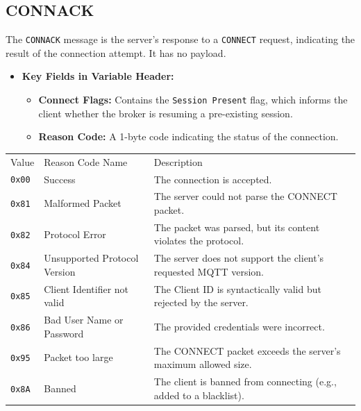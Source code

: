 \documentclass[a4paper, 12pt]{book} %
\begin{document}
\subsection{CONNACK}\label{connack}

The \texttt{CONNACK} message is the server's response to a
\texttt{CONNECT} request, indicating the result of the connection
attempt. It has no payload.

\begin{itemize}
\tightlist
\item
  \textbf{Key Fields in Variable Header:}

  \begin{itemize}
  \tightlist
  \item
    \textbf{Connect Flags:} Contains the \texttt{Session\ Present} flag,
    which informs the client whether the broker is resuming a
    pre-existing session.
  \item
    \textbf{Reason Code:} A 1-byte code indicating the status of the
    connection.
  \end{itemize}
\end{itemize}

\begin{longtable}[]{@{}
  >{\raggedright\arraybackslash}p{}
  >{\raggedright\arraybackslash}p{}
  >{\raggedright\arraybackslash}p{}@{}}
\toprule\noalign{}
\endhead
\bottomrule\noalign{}
\endlastfoot
Value & Reason Code Name & Description \\
\texttt{0x00} & Success & The connection is accepted. \\
\texttt{0x81} & Malformed Packet & The server could not parse the
CONNECT packet. \\
\texttt{0x82} & Protocol Error & The packet was parsed, but its content
violates the protocol. \\
\texttt{0x84} & Unsupported Protocol Version & The server does not
support the client's requested MQTT version. \\
\texttt{0x85} & Client Identifier not valid & The Client ID is
syntactically valid but rejected by the server. \\
\texttt{0x86} & Bad User Name or Password & The provided credentials
were incorrect. \\
\texttt{0x95} & Packet too large & The CONNECT packet exceeds the
server's maximum allowed size. \\
\texttt{0x8A} & Banned & The client is banned from connecting (e.g.,
added to a blacklist). \\
\end{longtable}
\end{document}
